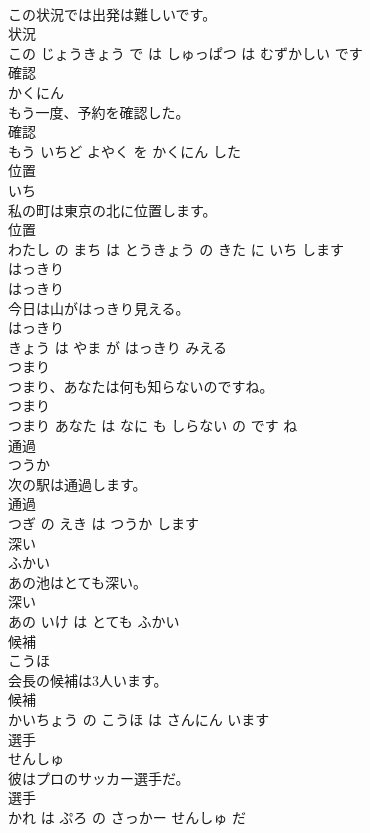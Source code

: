 \documentclass[8pt]{extreport}
\begin{document}
\begin{CJK}{UTF8}{min}
\\	この状況では出発は難しいです。	
\\	状況 
\\	この じょうきょう で は しゅっぱつ は むずかしい です			
\\	確認	
\\	かくにん			
\\	もう一度、予約を確認した。	
\\	確認 
\\	もう いちど よやく を かくにん した			
\\	位置	
\\	いち			
\\	私の町は東京の北に位置します。	
\\	位置 
\\	わたし の まち は とうきょう の きた に いち します			
\\	はっきり	
\\	はっきり			
\\	今日は山がはっきり見える。	
\\	はっきり 
\\	きょう は やま が はっきり みえる			
\\	つまり	
\\	つまり、あなたは何も知らないのですね。	
\\	つまり 
\\	つまり あなた は なに も しらない の です ね			
\\	通過	
\\	つうか			
\\	次の駅は通過します。	
\\	通過 
\\	つぎ の えき は つうか します			
\\	深い	
\\	ふかい			
\\	あの池はとても深い。	
\\	深い 
\\	あの いけ は とても ふかい			
\\	候補	
\\	こうほ			
\\	会長の候補は3人います。	
\\	候補 
\\	かいちょう の こうほ は さんにん います			
\\	選手	
\\	せんしゅ			
\\	彼はプロのサッカー選手だ。	
\\	選手 
\\	かれ は ぷろ の さっかー せんしゅ だ			

\end{CJK}
\end{document}
